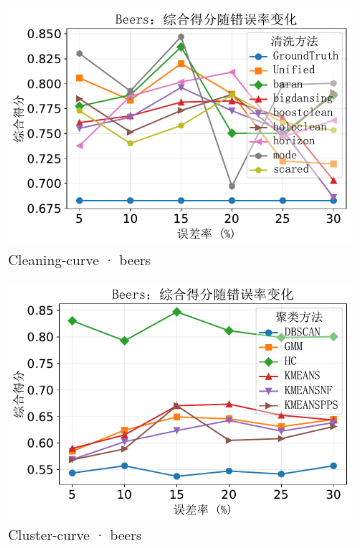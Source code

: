 \documentclass[10pt]{article} %
\numberwithin{equation}{section}
\begin{document}
\begin{figure}[htbp]
  \centering\footnotesize
  \setlength{\abovecaptionskip}{4pt}
  \setlength{\belowcaptionskip}{0pt}

  \begin{subfigure}{0.35\linewidth}
    \centering
    \includegraphics[width=\linewidth]{figures/5.3.2graph/beers_combined_score_cleaning.pdf}
    \caption{Cleaning-curve · beers}
  \end{subfigure}\hfill
  \begin{subfigure}{0.35\linewidth}
    \centering
    \includegraphics[width=\linewidth]{figures/5.3.2graph/beers_combined_score_cluster.pdf}
    \caption{Cluster-curve · beers}
  \end{subfigure}\hfill
  \begin{subfigure}{0.295\linewidth}

\end{subfigure}
\end{figure}
\end{document}
